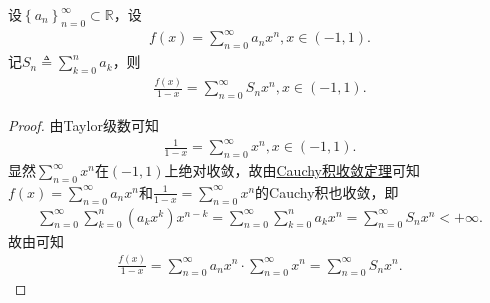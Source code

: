 \documentclass[../../main.tex]{subfiles}
\begin{document}
\begin{proposition}\label{proposition:幂级数Cauchy积常用技巧}
设$\left\{ a_n \right\} _{n=0}^{\infty}\subset \mathbb{R}$，设
\begin{align*}
f\left( x \right) =\sum_{n=0}^{\infty}{a_nx^n},x\in \left( -1,1 \right) .
\end{align*}
记$S_n\triangleq \sum_{k=0}^n{a_k}$，则
\begin{align*}
\frac{f\left( x \right)}{1-x}=\sum_{n=0}^{\infty}{S_nx^n},x\in \left( -1,1 \right) .
\end{align*}
\end{proposition}
\begin{proof}
由Taylor级数可知
\begin{align*}
\frac{1}{1-x}=\sum_{n=0}^{\infty}{x^n},x\in \left( -1,1 \right) .
\end{align*}
显然$\sum_{n=0}^{\infty}{x^n}$在$\left( -1,1 \right)$上绝对收敛，故由\hyperref[theorem:Cauchy积收敛定理]{Cauchy积收敛定理}可知$f\left( x \right) =\sum_{n=0}^{\infty}{a_nx^n}$和$\frac{1}{1-x}=\sum_{n=0}^{\infty}{x^n}$的Cauchy积也收敛，即
\begin{align*}
\sum_{n=0}^{\infty}{\sum_{k=0}^n{\left( a_kx^k \right) x^{n-k}}}=\sum_{n=0}^{\infty}{\sum_{k=0}^n{a_kx^n}}=\sum_{n=0}^{\infty}{S_nx^n}<+\infty .
\end{align*}
故由可知
\begin{align*}
\frac{f\left( x \right)}{1-x}=\sum_{n=0}^{\infty}{a_nx^n}\cdot \sum_{n=0}^{\infty}{x^n}=\sum_{n=0}^{\infty}{S_nx^n}.
\end{align*}
\end{proof}
\end{document}

